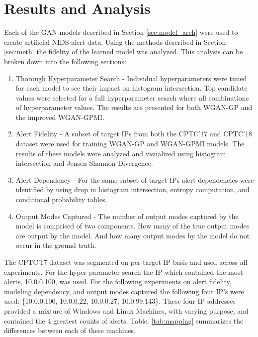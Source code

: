 \chapter{Results and Analysis}
\label{sec:rna}


Each of the GAN models described in Section \ref{sec:model_arch} were used to create artificial NIDS alert data.  Using the methods described in Section \ref{sec:meth} the fidelity of the learned model was analyzed. This analysis can be broken down into the following sections:

\begin{enumerate}
	\item Thorough Hyperparameter Search - Individual hyperparameters were tuned for each model to see their impact on histogram intersection. Top candidate values were selected for a full hyperparameter search where all combinations of hyperparameter values. The results are presented for both WGAN-GP and the improved WGAN-GPMI.
	
	\item Alert Fidelity - A subset of target IPs from both the CPTC'17 and CPTC'18 dataset were used for training WGAN-GP and WGAN-GPMI models. The results of these models were analyzed and visualized using histogram intersection and Jensen-Shannon Divergence.
	
	\item Alert Dependency - For the same subset of target IPs alert dependencies were identified by using drop in histogram intersection, entropy computation, and conditional probability tables.
	
	\item Output Modes Captured - The number of output modes captured by the model is comprised of two components. How many of the true output modes are output by the model. And how many output modes by the model do not occur in the ground truth. 

\end{enumerate}

The CPTC'17 dataset was segmented on per-target IP basis and used across all experiments. For the hyper parameter search the IP which contained the most alerts, 10.0.0.100, was used. For the following experiments on alert fidelity, modeling dependency, and output modes captured the following four IP's were used: \{10.0.0.100, 10.0.0.22, 10.0.0.27, 10.0.99.143\}. These four IP addresses provided a mixture of Windows and Linux Machines, with varying purpose, and contained the 4 greatest counts of alerts. Table. \ref{tab:mapping} summarizes the differences between each of these machines. 

